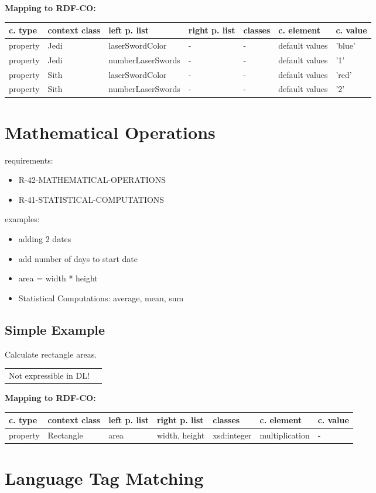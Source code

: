 \documentclass{llncs}
\newenvironment{gcotable}{
  \scriptsize
  \sffamily
  \vspace{0cm}
	\begin{center}
	\textbf{\vspace{0.4cm}Mapping to RDF-CO:} \\
  \begin{tabular}{l|l|l|l|l|l|l}
	\hline
  \textbf{c. type} & \textbf{context class} & \textbf{left p. list} & \textbf{right p. list} & \textbf{classes} & \textbf{c. element} & \textbf{c. value} \\
  \hline

}{
  \hline
  \end{tabular}
	\end{center}
}
\newenvironment{DL}{
  \vspace{0cm}
	\begin{center}
  \begin{tabular}{r l}

}{
  \end{tabular}
	\end{center}
}
\begin{document}
\begin{gcotable}
property & Jedi & laserSwordColor & - & - & default values & 'blue' \\
property & Jedi & numberLaserSwords & - & - & default values & '1' \\
property & Sith & laserSwordColor & - & - & default values & 'red' \\
property & Sith & numberLaserSwords & - & - & default values & '2' \\
\end{gcotable}

\section{Mathematical Operations}

requirements:

\begin{itemize}
	\item R-42-MATHEMATICAL-OPERATIONS
	\item R-41-STATISTICAL-COMPUTATIONS
\end{itemize}



examples:

\begin{itemize}
	\item adding 2 dates
	\item add number of days to start date
	\item area = width * height
	\item Statistical Computations: average, mean, sum
\end{itemize}

\subsection{Simple Example}

Calculate rectangle areas.

\begin{DL}
Not expressible in DL!
\end{DL}

\begin{gcotable}
property & Rectangle & area & width, height & xsd:integer & multiplication & - \\
\end{gcotable}

\section{Language Tag Matching}
\end{document}
